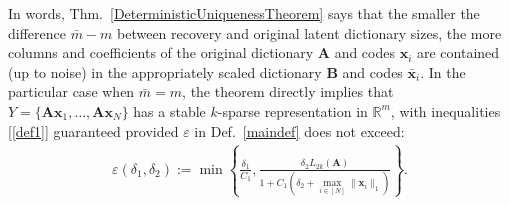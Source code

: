 \documentclass[9pt,twocolumn]{pnas-new}
\renewcommand{\eqref}[1]{\textnormal{[\ref{#1}]}}
\begin{document}
In words, Thm.~\ref{DeterministicUniquenessTheorem} says that the smaller the difference $\bar m - m$ between recovery and original latent dictionary sizes, the more columns and coefficients of the original dictionary $\mathbf{A}$ and codes $\mathbf{x}_i$ are contained (up to noise) in the appropriately scaled dictionary $\mathbf{B}$ and codes $\mathbf{\bar x}_i$.  In the particular case when $\bar m = m$, the theorem directly implies that  $Y = \{\mathbf{Ax}_1, \ldots, \mathbf{Ax}_N\}$ has a stable $k$-sparse representation in $\mathbb{R}^m$, with inequalities \eqref{def1} guaranteed provided $\varepsilon$ in Def.~\ref{maindef} does not exceed: 
\begin{align}\label{epsdel}
\varepsilon(\delta_1, \delta_2) := \min \left\{ \frac{\delta_1}{ C_1 }, \frac{ \delta_2 L_{2k}(\mathbf{A})}{ 1 + C_1 \left( \delta_2 + \max_{i \in [N]} \|\mathbf{x}_i\|_1  \right) } \right\}.
\end{align}
\end{document}
